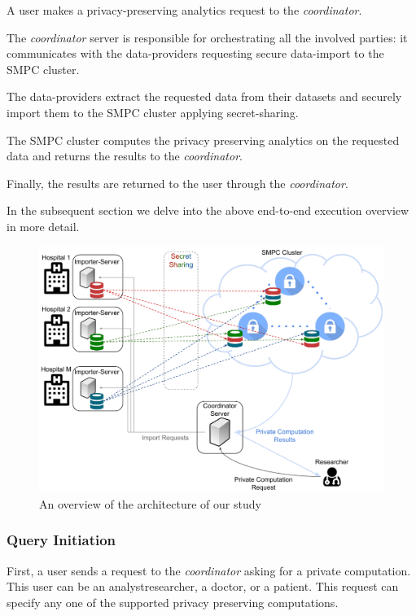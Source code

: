 \begin{description}[labelwidth=4em, leftmargin=\dimexpr\labelwidth+\labelsep\relax]
    \item [Step 1:] A user makes a privacy\hyp preserving analytics request to the \textit{coordinator}.
    \item [Step 2:] The \textit{coordinator} server is responsible for orchestrating all the involved parties: it communicates with the data\hyp providers requesting secure data\hyp import to the SMPC cluster.
    \item [Step 3:] The data\hyp providers extract the requested data from their datasets and securely import them to the SMPC cluster applying secret\hyp sharing.
    \item [Step 4:] The SMPC cluster computes the privacy preserving analytics on the requested data and returns the results to the \textit{coordinator}.
    \item [Step 5:] Finally, the results are returned to the user through the \textit{coordinator}.
\end{description}

In the subsequent section we delve into the above end\hyp to\hyp end execution overview in more detail.

\begin{figure}[t]
  \centering
  \includegraphics[width=\linewidth]{figures/overview.pdf}
  \caption{An overview of the architecture of our study}\label{f:overview}
\end{figure}

\subsubsection{Query Initiation}\label{sss:query-initiation}
First, a user sends a request to the \textit{coordinator} asking for a private computation.
This user can be an analyst\myslash researcher, a doctor, or a patient.
This request can specify any one of the supported privacy preserving computations.

